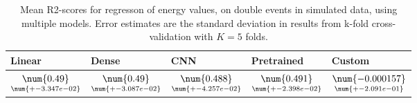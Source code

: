 \begin{table}
\centering
\caption{
Mean R2-scores for regresson of energy values, on double events in simulated data, using multiple models. 
Error estimates are the standard deviation in results from k-fold cross-validation 
with $K=5$ folds.
}
\label{tab:regression-simulated-double-energy-r2}
\begin{tabular}{lllll}
\toprule
                                            Linear &                                              Dense &                                                 CNN &                                          Pretrained &                                                  Custom \\
\midrule
 $\underset{\num{+- 3.347e-02 }  }{\num{ 0.49 } }$ &  $\underset{\num{+- 3.087e-02 }  }{\num{ 0.49 } }$ &  $\underset{\num{+- 4.257e-02 }  }{\num{ 0.488 } }$ &  $\underset{\num{+- 2.398e-02 }  }{\num{ 0.491 } }$ &  $\underset{\num{+- 2.091e-01 }  }{\num{ -0.000157 } }$ \\
\bottomrule
\end{tabular}
\end{table}
